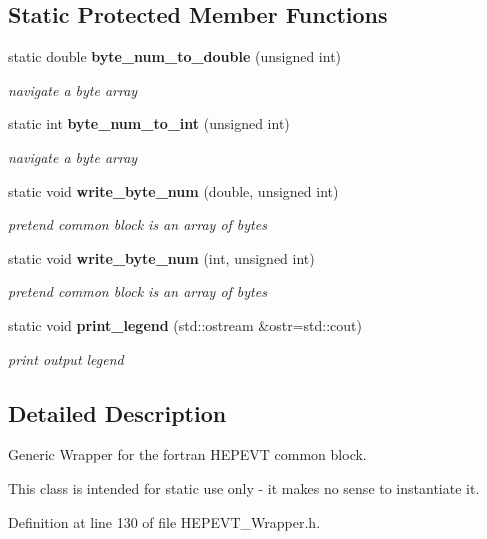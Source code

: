 \subsection*{Static Protected Member Functions}
\begin{CompactItemize}
\item 
static double {\bf byte\_\-num\_\-to\_\-double} (unsigned int)
\begin{CompactList}\small\item\em navigate a byte array \item\end{CompactList}\item 
static int {\bf byte\_\-num\_\-to\_\-int} (unsigned int)
\begin{CompactList}\small\item\em navigate a byte array \item\end{CompactList}\item 
static void {\bf write\_\-byte\_\-num} (double, unsigned int)
\begin{CompactList}\small\item\em pretend common block is an array of bytes \item\end{CompactList}\item 
static void {\bf write\_\-byte\_\-num} (int, unsigned int)
\begin{CompactList}\small\item\em pretend common block is an array of bytes \item\end{CompactList}\item 
static void {\bf print\_\-legend} (std::ostream \&ostr=std::cout)
\begin{CompactList}\small\item\em print output legend \item\end{CompactList}\end{CompactItemize}


\subsection{Detailed Description}
Generic Wrapper for the fortran HEPEVT common block. 

This class is intended for static use only - it makes no sense to instantiate it. 



Definition at line 130 of file HEPEVT\_\-Wrapper.h.

